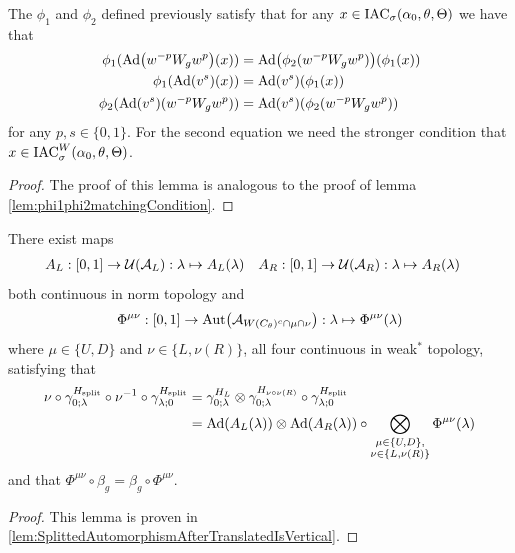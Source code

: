 \documentclass[12pt,a4paper,twoside]{article}
\numberwithin{equation}{section}
\begin{document}
\begin{lemma}\label{lem:phi1phi2matchingConditionH1ValuedIndex}
The $\phi_1$ and $\phi_2$ defined previously satisfy that for any $x\in\textrm{IAC}_{\sigma}(\alpha_0,\theta,\Theta)$ we have that
	\begin{align}
		\phi_1(\Ad{w^{-p} W_g w^{p}}(x))&=\Ad{\phi_2(w^{-p} W_g w^{p})}(\phi_1(x))\\
		\phi_1(\Ad{v^{s}}(x))&=\Ad{v^{s}}(\phi_1(x))\\
		\phi_2(\Ad{v^s}(w^{-p} W_gw^{p}))&=\Ad{v^s}(\phi_2(w^{-p} W_g w^{p}))
	\end{align}
	for any $p,s\in\{0,1\}$. For the second equation we need the stronger condition that $x\in\textrm{IAC}_{\sigma}^W(\alpha_0,\theta,\Theta)$.
\end{lemma}
\begin{proof}
	The proof of this lemma is analogous to the proof of lemma \ref{lem:phi1phi2matchingCondition}.
\end{proof}
\begin{lemma}\label{lem:TranslatingSplittedTimeEvolution}
	There exist maps
	\begin{align}
		A_L&:[0,1]\rightarrow \mathcal U(\mathcal A_L):\lambda\mapsto A_{L}(\lambda)&A_R&:[0,1]\rightarrow \mathcal U(\mathcal A_R):\lambda\mapsto A_{R}(\lambda)
	\end{align}
	both continuous in norm topology and
	\begin{align}
		\Phi^{\mu\nu}:[0,1]\rightarrow\Aut{\AA_{W(C_\theta)^c\cap\mu\cap\nu}}:\lambda\mapsto \Phi^{\mu\nu}(\lambda)
	\end{align}
	where $\mu\in\{U,D\}$ and $\nu\in\{L,\nu(R)\}$, all four continuous in weak$^*$ topology, satisfying that
	\begin{align}
		\nu\circ\gamma^{H_{\text{split}}}_{0;\lambda}\circ\nu^{-1}\circ\gamma^{H_{\text{split}}}_{\lambda;0}&=\gamma^{H_L}_{0;\lambda}\otimes\gamma^{H_{\nu\circ\nu(R)}}_{0;\lambda}\circ\gamma^{H_{\text{split}}}_{\lambda;0}\\
		\label{eq:TranslatingSplittedTimeEvolution}
		&=\Ad{A_L(\lambda)}\otimes\Ad{A_R(\lambda)}\circ\bigotimes_{\substack{\mu\in\{U,D\},\\\nu\in\{L,\nu(R)\}}}\Phi^{\mu\nu}(\lambda)
	\end{align}
	and that $\Phi^{\mu\nu}\circ\beta_g=\beta_g\circ\Phi^{\mu\nu}$.
\end{lemma}
\begin{proof}
	This lemma is proven in \ref{lem:SplittedAutomorphismAfterTranslatedIsVertical}.
\end{proof}
\end{document}
